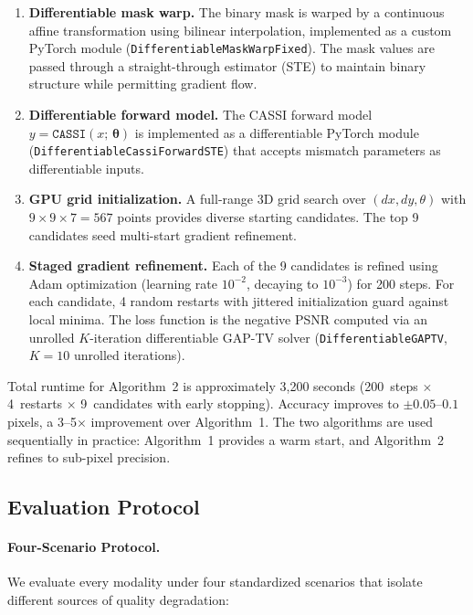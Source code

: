 \documentclass[11pt]{article}
\begin{document}
\begin{sloppypar}
\begin{enumerate}
  \item \textbf{Differentiable mask warp.}  The binary mask is warped by a
    continuous affine transformation using bilinear interpolation,
    implemented as a custom PyTorch module
    (\texttt{DifferentiableMaskWarpFixed}).  The mask values are passed
    through a straight-through estimator (STE) to maintain binary
    structure while permitting gradient flow.
  \item \textbf{Differentiable forward model.}  The CASSI forward model
    $y = \texttt{CASSI}(x;\, \boldsymbol{\theta})$ is implemented as a
    differentiable PyTorch module (\texttt{DifferentiableCassiForwardSTE})
    that accepts mismatch parameters as differentiable inputs.
  \item \textbf{GPU grid initialization.}  A full-range 3D grid search
    over $(dx, dy, \theta)$ with $9 \times 9 \times 7 = 567$ points
    provides diverse starting candidates.  The top 9 candidates seed
    multi-start gradient refinement.
  \item \textbf{Staged gradient refinement.}  Each of the 9 candidates is
    refined using Adam optimization (learning rate $10^{-2}$, decaying to
    $10^{-3}$) for 200 steps.  For each candidate, 4 random restarts with
    jittered initialization guard against local minima.  The loss function
    is the negative PSNR computed via an unrolled $K$-iteration
    differentiable GAP-TV solver (\texttt{DifferentiableGAPTV}, $K=10$
    unrolled iterations).
\end{enumerate}
\end{sloppypar}

Total runtime for Algorithm~2 is approximately 3,200 seconds
(200~steps $\times$ 4~restarts $\times$ 9~candidates with early stopping).
Accuracy improves to $\pm 0.05$--$0.1$ pixels, a 3--5$\times$ improvement
over Algorithm~1.  The two algorithms are used sequentially in practice:
Algorithm~1 provides a warm start, and Algorithm~2 refines to sub-pixel
precision.


\subsection*{Evaluation Protocol}
\label{sec:methods:eval}

\paragraph{Four-Scenario Protocol.}
We evaluate every modality under four standardized scenarios that
isolate different sources of quality degradation:
\end{document}
